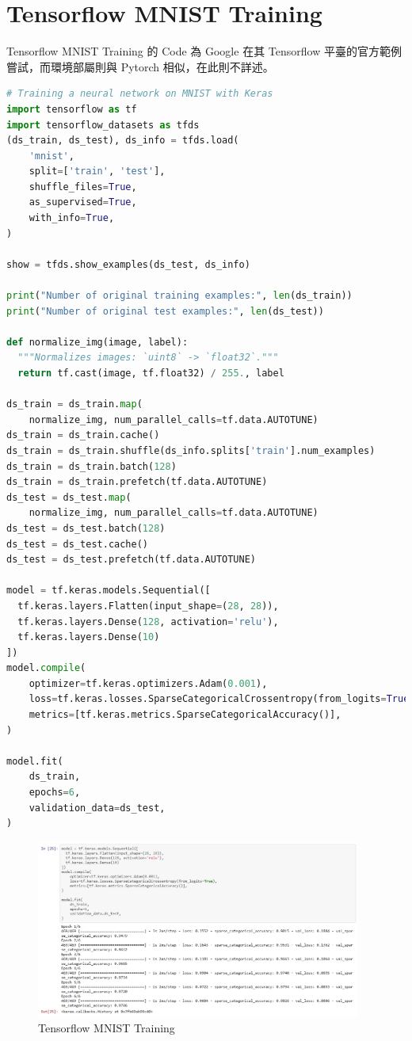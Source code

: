 \documentclass[11pt,UTF8]{ctexart}
\begin{document}
\newpage

\section{Tensorflow MNIST Training}

Tensorflow MNIST Training 的 Code 為 Google 在其 Tensorflow 平臺的官方範例嘗試，而環境部屬則與 Pytorch 相似，在此則不詳述。

	\begin{lstlisting}[language={python}]
# Training a neural network on MNIST with Keras
import tensorflow as tf
import tensorflow_datasets as tfds
(ds_train, ds_test), ds_info = tfds.load(
    'mnist',
    split=['train', 'test'],
    shuffle_files=True,
    as_supervised=True,
    with_info=True,
)

show = tfds.show_examples(ds_test, ds_info)

print("Number of original training examples:", len(ds_train))
print("Number of original test examples:", len(ds_test))

def normalize_img(image, label):
  """Normalizes images: `uint8` -> `float32`."""
  return tf.cast(image, tf.float32) / 255., label

ds_train = ds_train.map(
    normalize_img, num_parallel_calls=tf.data.AUTOTUNE)
ds_train = ds_train.cache()
ds_train = ds_train.shuffle(ds_info.splits['train'].num_examples)
ds_train = ds_train.batch(128)
ds_train = ds_train.prefetch(tf.data.AUTOTUNE)
ds_test = ds_test.map(
    normalize_img, num_parallel_calls=tf.data.AUTOTUNE)
ds_test = ds_test.batch(128)
ds_test = ds_test.cache()
ds_test = ds_test.prefetch(tf.data.AUTOTUNE)

model = tf.keras.models.Sequential([
  tf.keras.layers.Flatten(input_shape=(28, 28)),
  tf.keras.layers.Dense(128, activation='relu'),
  tf.keras.layers.Dense(10)
])
model.compile(
    optimizer=tf.keras.optimizers.Adam(0.001),
    loss=tf.keras.losses.SparseCategoricalCrossentropy(from_logits=True),
    metrics=[tf.keras.metrics.SparseCategoricalAccuracy()],
)

model.fit(
    ds_train,
    epochs=6,
    validation_data=ds_test,
)
	\end{lstlisting}

\begin{figure}[H]
\centering 
\includegraphics[width=0.95\textwidth]{t2.png} 
\caption{Tensorflow MNIST Training}
\label{Test}
\end{figure}
\end{document}
